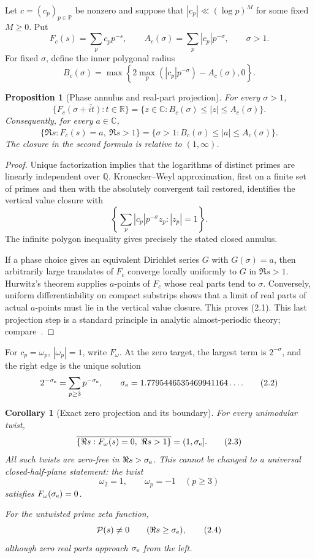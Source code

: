 \documentclass[11pt]{article}
\newtheorem{proposition}[theorem]{Proposition}
\newtheorem{corollary}[theorem]{Corollary}
\theoremstyle{definition}
\theoremstyle{remark}
\newcommand{\PP}{\mathbb P}
\newcommand{\cP}{\mathcal P}
\newcommand{\C}{\mathbb C}
\newcommand{\R}{\mathbb R}
\begin{document}
Let $c=(c_p)_{p\in\PP}$ be nonzero and suppose that
$|c_p|\ll(\log p)^M$ for some fixed $M\ge0$.  Put
\[
 F_c(s)=\sum_pc_pp^{-s},\qquad
 A_c(\sigma)=\sum_p|c_p|p^{-\sigma},\qquad \sigma>1.
\]
For fixed $\sigma$, define the inner polygonal radius
\[
 B_c(\sigma)=
 \max\left\{2\max_p(|c_p|p^{-\sigma})-A_c(\sigma),0\right\}.
\]

\begin{proposition}[Phase annulus and real-part projection]
\label{prop:phase-annulus}
For every $\sigma>1$,
\[
 \overline{\{F_c(\sigma+it):t\in\R\}}
 =\{z\in\C:B_c(\sigma)\le |z|\le A_c(\sigma)\}.
\]
Consequently, for every $a\in\C$,
\[
 \boxed{
 \overline{\{\Re s:F_c(s)=a,\ \Re s>1\}}
 =\{\sigma>1:B_c(\sigma)\le |a|\le A_c(\sigma)\}.
 }
\tag{2.1}
\]
The closure in the second formula is relative to $(1,\infty)$.
\end{proposition}

\begin{proof}
Unique factorization implies that the logarithms of distinct primes are linearly
independent over $\mathbb Q$.  Kronecker--Weyl approximation, first on a finite set of
primes and then with the absolutely convergent tail restored, identifies the vertical
value closure with
\[
 \left\{\sum_p|c_p|p^{-\sigma}z_p:|z_p|=1\right\}.
\]
The infinite polygon inequality gives precisely the stated closed annulus.

If a phase choice gives an equivalent Dirichlet series $G$ with $G(\sigma)=a$, then
arbitrarily large translates of $F_c$ converge locally uniformly to $G$ in
$\Re s>1$.  Hurwitz's theorem supplies $a$-points of $F_c$ whose real parts tend to
$\sigma$.  Conversely, uniform differentiability on compact substrips shows that a
limit of real parts of actual $a$-points must lie in the vertical value closure.
This proves (2.1).  This last projection step is a standard principle in analytic
almost-periodic theory; compare~\cite{JessenTornehave1945,SepulcreVidal2022}.
\end{proof}

For $c_p=\omega_p$, $|\omega_p|=1$, write $F_\omega$.  At the zero target, the largest
term is $2^{-\sigma}$, and the right edge is the unique solution
\[
 2^{-\sigma_{\rm e}}=\sum_{p\ge3}p^{-\sigma_{\rm e}},
 \qquad
 \sigma_{\rm e}=1.7795446535469941164\ldots .
\tag{2.2}
\]

\begin{corollary}[Exact zero projection and its boundary]
\label{cor:zero-projection}
For every unimodular twist,
\[
 \overline{\{\Re s:F_\omega(s)=0,\ \Re s>1\}}
 =(1,\sigma_{\rm e}].
\tag{2.3}
\]
All such twists are zero-free in $\Re s>\sigma_{\rm e}$.  This cannot be changed to a
universal closed-half-plane statement: the twist
\[
 \omega_2=1,\qquad \omega_p=-1\quad(p\ge3)
\]
satisfies $F_\omega(\sigma_{\rm e})=0$.

For the untwisted prime zeta function,
\[
 \cP(s)\ne0\qquad(\Re s\ge\sigma_{\rm e}),
\tag{2.4}
\]
although zero real parts approach $\sigma_{\rm e}$ from the left.
\end{corollary}
\end{document}
